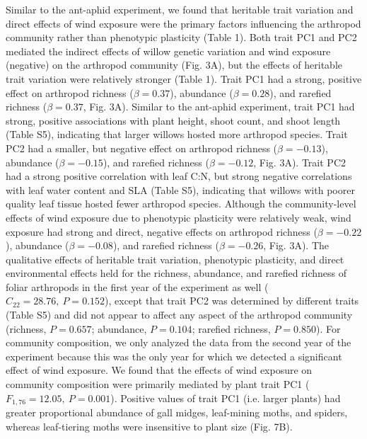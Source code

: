\documentclass[11pt]{article}
\begin{document}
Similar to the ant-aphid experiment, we found that heritable trait
variation and direct effects of wind exposure were the primary factors
influencing the arthropod community rather than phenotypic plasticity
(Table 1). Both trait PC1 and PC2 mediated the indirect effects of
willow genetic variation and wind exposure (negative) on the arthropod
community (Fig. 3A), but the effects of heritable trait variation were
relatively stronger (Table 1). Trait PC1 had a strong, positive effect
on arthropod richness ($\beta = 0.37$), abundance ($\beta =
0.28$), and rarefied richness ($\beta = 0.37$, Fig. 3A). Similar to the
ant-aphid experiment, trait PC1 had strong, positive associations with
plant height, shoot count, and shoot length (Table S5), indicating that
larger willows hosted more arthropod species. Trait PC2 had a smaller,
but negative effect on arthropod richness ($\beta = -0.13$),
abundance ($\beta = -0.15$), and rarefied richness ($\beta =
-0.12$, Fig. 3A). Trait PC2 had a strong positive correlation with leaf
C:N, but strong negative correlations with leaf water content and SLA
(Table S5), indicating that willows with poorer quality leaf tissue
hosted fewer arthropod species. Although the community-level effects of
wind exposure due to phenotypic plasticity were relatively weak, wind
exposure had strong and direct, negative effects on arthropod richness
($\beta = -0.22$), abundance ($\beta = -0.08$), and rarefied
richness ($\beta = -0.26$, Fig. 3A). The qualitative effects of
heritable trait variation, phenotypic plasticity, and direct
environmental effects held for the richness, abundance, and rarefied
richness of foliar arthropods in the first year of the experiment as
well (\(C_{22}=28.76,\ P=0.152\)), except that trait PC2 was determined by
different traits (Table S5) and did not appear to affect any aspect of
the arthropod community (richness, \(P=0.657\); abundance,
\(P=0.104\); rarefied richness, \(P=0.850\)). For community
composition, we only analyzed the data from the second year of the
experiment because this was the only year for which we detected a
significant effect of wind exposure. We found that the effects of wind
exposure on community composition were primarily mediated by plant trait
PC1 (\(F_{1,76}=12.05,\ P=0.001\)). Positive values of trait PC1 (i.e. larger
plants) had greater proportional abundance of gall midges, leaf-mining
moths, and spiders, whereas leaf-tiering moths were insensitive to plant
size (Fig. 7B).
\end{document}
